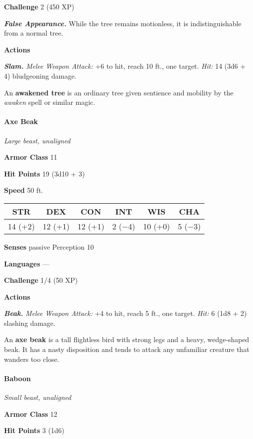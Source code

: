 \documentclass[
]{article}
\begin{document}
\textbf{Challenge} 2 (450 XP)

\emph{\textbf{False Appearance.}} While the tree remains motionless, it
is indistinguishable from a normal tree.

\textbf{Actions}

\emph{\textbf{Slam.}} \emph{Melee Weapon Attack:} +6 to hit, reach 10
ft., one target. \emph{Hit:} 14 (3d6 + 4) bludgeoning damage.

An \textbf{awakened tree} is an ordinary tree given sentience and
mobility by the \emph{awaken} spell or similar magic.

\hypertarget{axe-beak}{%
\paragraph{Axe Beak}\label{axe-beak}}

\emph{Large beast, unaligned}

\textbf{Armor Class} 11

\textbf{Hit Points} 19 (3d10 + 3)

\textbf{Speed} 50 ft.

\begin{longtable}[]{@{}cccccc@{}}
\toprule
STR & DEX & CON & INT & WIS & CHA\tabularnewline
\midrule
\endhead
14 (+2) & 12 (+1) & 12 (+1) & 2 (−4) & 10 (+0) & 5 (−3)\tabularnewline
\bottomrule
\end{longtable}

\textbf{Senses} passive Perception 10

\textbf{Languages} ---

\textbf{Challenge} 1/4 (50 XP)

\textbf{Actions}

\emph{\textbf{Beak.}} \emph{Melee Weapon Attack:} +4 to hit, reach 5
ft., one target. \emph{Hit:} 6 (1d8 + 2) slashing damage.

An \textbf{axe beak} is a tall flightless bird with strong legs and a
heavy, wedge-shaped beak. It has a nasty disposition and tends to attack
any unfamiliar creature that wanders too close.

\hypertarget{baboon}{%
\paragraph{Baboon}\label{baboon}}

\emph{Small beast, unaligned}

\textbf{Armor Class} 12

\textbf{Hit Points} 3 (1d6)
\end{document}

